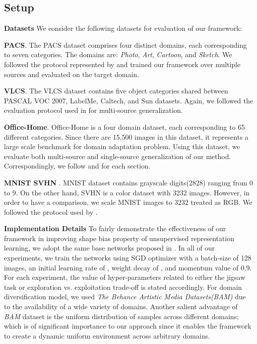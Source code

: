 \documentclass[10pt,twocolumn,letterpaper]{article}
\begin{document}
\subsection{Setup}
\noindent
\textbf{Datasets}\quad 
We consider the following datasets for evaluation of our framework:

\textbf{PACS}. The PACS dataset \cite{li2017deeper} comprises four distinct domains, each corresponding to seven categories. The domains are: \textit{Photo}, \textit{Art}, \textit{Cartoon}, and \textit{Sketch}. We followed the protocol represented by \cite{carlucci2019domain} and trained our framework over multiple sources and evaluated on the target domain.

\textbf{VLCS}. The VLCS dataset \cite{torralba2011unbiased} contains five object categories shared between PASCAL VOC 2007, LabelMe, Caltech, and Sun datasets. Again, we followed the evaluation protocol used in \cite{carlucci2019domain} for multi-source generalization.

\textbf{Office-Home}. Office-Home \cite{venkateswara2017deep} is a four domain dataset, each corresponding to 65 different categories. Since there are 15,500 images in this dataset, it represents a large scale benchmark for domain adaptation problem. Using this dataset, we evaluate both multi-source and single-source generalization of our method. Correspondingly, we follow \cite{carlucci2019domain} and \cite{roy2019unsupervised} for each section. 

\textbf{MNIST  SVHN }. MNIST dataset \cite{lecun1998gradient} contains grayscale digits(2828) ranging from 0 to 9. On the other hand, SVHN \cite{netzer2011reading} is a color dataset with 3232 images.  However, in order to have a comparison, we scale MNIST images to 3232 treated as RGB. We followed the protocol used by \cite{roy2019unsupervised}.

\vspace{2mm}
\noindent
\textbf{Implementation Details}\quad 
To fairly demonstrate the effectiveness of our framework in improving shape bias property of unsupervised representation learning, we adopt the same base networks proposed in \cite{carlucci2019domain}. In all of our experiments, we train the networks using SGD optimizer with a batch-size of 128 images, an initial learning rate of , weight decay of , and momentum value of 0.9. For each experiment, the value of hyper-parameters related to either the jigsaw task or exploration vs. exploitation trade-off is stated accordingly.
For domain diversification model, we used \textit{The Behance Artistic Media Datasets(BAM)} \cite{Wilber_2017_ICCV} due to the availability of a wide variety of domains. Another salient advantage of \textit{BAM} dataset is the uniform distribution of samples across different domains; which is of significant importance to our approach since it enables the framework to create a dynamic uniform environment across arbitrary domains.
\end{document}
